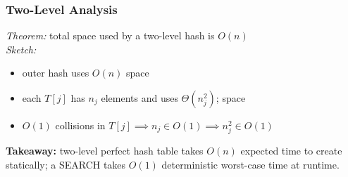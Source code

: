 \documentclass{beamer}
\begin{document}
\begin{frame} \frametitle{Two-Level Analysis}
\emph{Theorem:} total space used by a two-level hash is $O(n)$ \\
\emph{Sketch:}
\begin{itemize}
  \item outer hash uses $O(n)$ space
  \item each $T[j]$ has $n_j$ elements and uses $\Theta(n_j^2)$; space
  \item $O(1)$ collisions in $T[j] \implies n_j \in O(1) \implies n_j^2 \in O(1)$
\end{itemize}
\vspace{.5cm}
\textbf{Takeaway:} two-level perfect hash table takes $O(n)$ expected time to
create statically; a SEARCH takes $O(1)$ deterministic worst-case time at runtime.
\end{frame}
\end{document}
